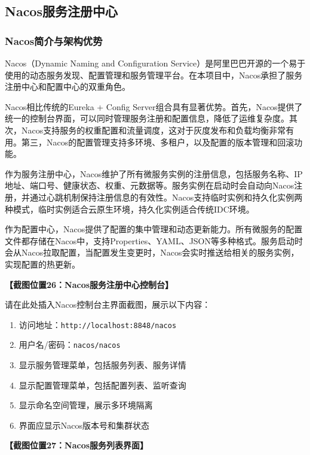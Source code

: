 \documentclass[a4paper,12pt]{article}
\begin{document}
\subsection{Nacos服务注册中心}

\subsubsection{Nacos简介与架构优势}

Nacos（Dynamic Naming and Configuration Service）是阿里巴巴开源的一个易于使用的动态服务发现、配置管理和服务管理平台。在本项目中，Nacos承担了服务注册中心和配置中心的双重角色。

Nacos相比传统的Eureka + Config Server组合具有显著优势。首先，Nacos提供了统一的控制台界面，可以同时管理服务注册和配置信息，降低了运维复杂度。其次，Nacos支持服务的权重配置和流量调度，这对于灰度发布和负载均衡非常有用。第三，Nacos的配置管理支持多环境、多租户，以及配置的版本管理和回滚功能。

作为服务注册中心，Nacos维护了所有微服务实例的注册信息，包括服务名称、IP地址、端口号、健康状态、权重、元数据等。服务实例在启动时会自动向Nacos注册，并通过心跳机制保持注册信息的有效性。Nacos支持临时实例和持久化实例两种模式，临时实例适合云原生环境，持久化实例适合传统IDC环境。

作为配置中心，Nacos提供了配置的集中管理和动态更新能力。所有微服务的配置文件都存储在Nacos中，支持Properties、YAML、JSON等多种格式。服务启动时会从Nacos拉取配置，当配置发生变更时，Nacos会实时推送给相关的服务实例，实现配置的热更新。

\textbf{【截图位置26：Nacos服务注册中心控制台】}

请在此处插入Nacos控制台主界面截图，展示以下内容：
\begin{enumerate}
\item 访问地址：\texttt{http://localhost:8848/nacos}
\item 用户名/密码：\texttt{nacos/nacos}
\item 显示服务管理菜单，包括服务列表、服务详情
\item 显示配置管理菜单，包括配置列表、监听查询
\item 显示命名空间管理，展示多环境隔离
\item 界面应显示Nacos版本号和集群状态
\end{enumerate}

\textbf{【截图位置27：Nacos服务列表界面】}
\end{document}

